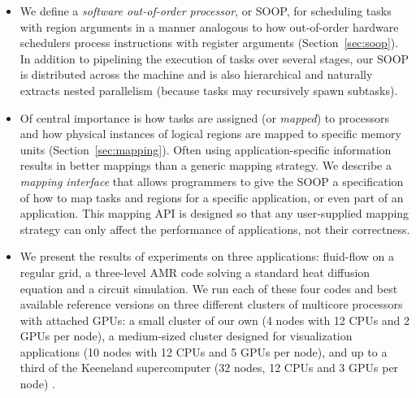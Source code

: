 \documentclass[conference]{IEEEtran}
\begin{document}
\begin{itemize}

\item We define a {\em software out-of-order processor}, or SOOP, for
  scheduling tasks with region arguments in a manner analogous to how
  out-of-order hardware schedulers process instructions with register
  arguments (Section~\ref{sec:soop}).  In addition to pipelining the execution of tasks over
  several stages, our SOOP is distributed across the machine and is
  also hierarchical and naturally extracts nested
  parallelism (because tasks may recursively spawn subtasks).



\item Of central importance is how
tasks are assigned (or {\em mapped}) to processors and how physical instances of logical regions are
mapped to specific memory units (Section~\ref{sec:mapping}).  Often using
application-specific information results in better
mappings than a generic mapping strategy.  We describe
a {\em mapping interface} that allows programmers to give the SOOP a specification
of how to map tasks and regions for a specific application, or even part of an
application.  This mapping API is designed so that
any user-supplied mapping strategy can only affect the performance of applications,
not their correctness.  


\item We present the results of experiments on three applications:
  fluid-flow on a regular grid, a three-level AMR code solving a
  standard heat diffusion equation and a circuit simulation.
  We run each of these four codes and best available reference
  versions on three different clusters of multicore processors with
  attached GPUs: a small cluster of our own (4 nodes with 12 CPUs and 2 GPUs per node), a medium-sized cluster
  designed for visualization applications (10 nodes with 12 CPUs and 5 GPUs per node), and up to a third of the
  Keeneland supercomputer (32 nodes, 12 CPUs and 3 GPUs per node) \cite{Keeneland}.
%
%

\end{itemize}











\end{document}

